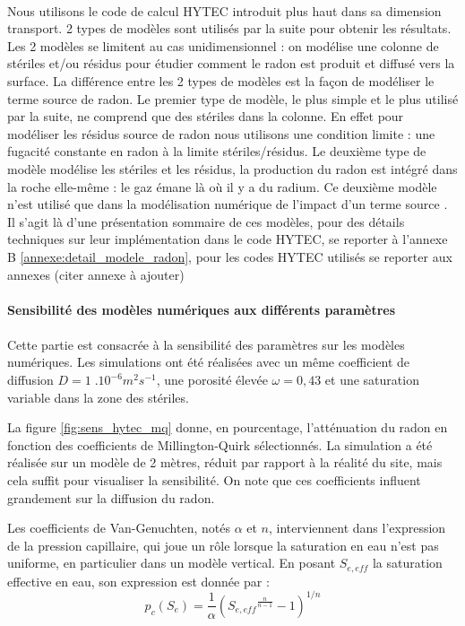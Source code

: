 \documentclass{article}
\begin{document}
\paragraph{} Nous utilisons le code de calcul HYTEC introduit plus haut dans sa dimension transport. 2 types de modèles sont utilisés par la suite pour obtenir les résultats. Les 2 modèles se limitent au cas unidimensionnel : on modélise une colonne de stériles et/ou résidus pour étudier comment le radon est produit et diffusé vers la surface. La différence entre les 2 types de modèles est la façon de modéliser le terme source de radon. Le premier type de modèle, le plus simple et le plus utilisé par la suite, ne comprend que des stériles dans la colonne. En effet pour modéliser les résidus source de radon nous utilisons une condition limite : une fugacité constante en radon à la limite stériles/résidus. Le deuxième type de modèle modélise les stériles et les résidus, la production du radon est intégré dans la roche elle-même : le gaz émane là où il y a du radium. Ce deuxième modèle n'est utilisé que dans la modélisation numérique de l'impact d'un terme source . Il s’agit là d’une présentation sommaire de ces modèles, pour des détails techniques sur leur implémentation dans le code HYTEC, se reporter à l'annexe B \ref{annexe:detail_modele_radon}, pour les codes HYTEC utilisés se reporter aux annexes (citer annexe à ajouter)

\paragraph{Sensibilité des modèles numériques aux différents paramètres}
\paragraph{} Cette partie est consacrée à la sensibilité des paramètres sur les modèles numériques. Les simulations ont été réalisées avec un même coefficient de diffusion $D = 1\;.10^{-6} m^2s^{-1}$, une porosité élevée $\omega = 0,43$ et une saturation variable dans la zone des stériles.

La figure \ref{fig:sens_hytec_mq} donne, en pourcentage, l'atténuation du radon en fonction des coefficients de Millington-Quirk sélectionnés. La simulation a été réalisée sur un modèle de 2 mètres, réduit par rapport à la réalité du site, mais cela suffit pour visualiser la sensibilité. On note que ces coefficients influent grandement sur la diffusion du radon.

Les coefficients de Van-Genuchten, notés $\alpha$ et $n$, interviennent dans l’expression de la pression capillaire, qui joue un rôle lorsque la saturation en eau n’est pas uniforme, en particulier dans un modèle vertical. En posant $S_{e,eff}$ la saturation effective en eau, son expression est donnée par :
$$
p_c (S_e)= \frac{1}{\alpha} ( {S_{e,eff} }^{\frac{n}{n-1}} -1 )^{1/n}
$$
\end{document}
